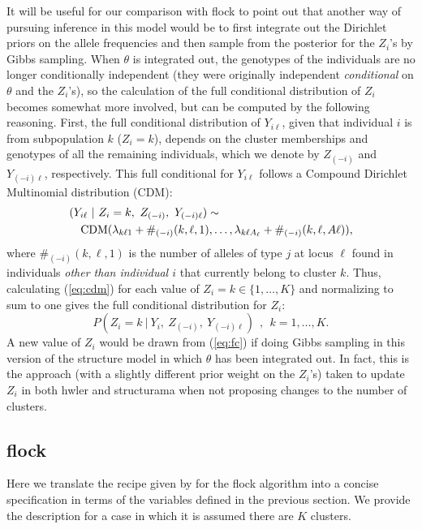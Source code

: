 It will be useful for our comparison with {\sc flock} to point out that another way 
of pursuing inference in this model would be to first integrate out the 
Dirichlet priors on the allele frequencies and then sample from the posterior
for the $Z_i$'s by Gibbs sampling.  When $\theta$ is integrated out, the genotypes 
of the individuals are no longer conditionally independent (they were originally
independent {\em conditional} on $\theta$ and the $Z_i$'s), so the calculation of 
the full conditional distribution of $Z_i$ becomes somewhat more involved,
but can be computed by the following reasoning. First, the full 
conditional distribution of $Y_{i\ell}$, given that individual $i$ is from subpopulation $k$
(\ie $Z_i=k$), depends on the 
cluster memberships and genotypes  of all the remaining individuals,
which we denote by  $Z_{(-i)}$ and $Y_{(-i)\ell}$, respectively.
This full conditional for $Y_{i\ell}$ follows 
a Compound Dirichlet Multinomial distribution (CDM):
\begin{eqnarray}
\lefteqn{(Y_{i\ell}~|~Z_i=k,~Z_{(-i)},~Y_{(-i)\ell}) \sim} \label{eq:cdm}\\
& & \mathrm{CDM}(\lambda_{k\ell 1} + \#_{(-i)}(k,\ell,1), \ldots,
\lambda_{k\ell A_\ell} + \#_{(-i)}(k,\ell,A\ell)), \nonumber
\end{eqnarray}
where $\#_{(-i)}(k,\ell,1)$ is the number of alleles of type $j$ at locus $\ell$
found in individuals {\em other than individual $i$} that currently
belong to cluster $k$. Thus, calculating (\ref{eq:cdm}) for each value of $Z_i=k \in 
\{1,\ldots,K\}$ 
and normalizing to sum to one gives the full conditional distribution for 
$Z_i$:
\begin{equation}
P(Z_i=k~|~Y_i, ~Z_{(-i)},~Y_{(-i)\ell})~~,~~k=1,\ldots,K.
\label{eq:fc}
\end{equation}
A new value of $Z_i$ would be drawn from (\ref{eq:fc}) if doing Gibbs sampling in this
version of the {\sc structure} model in which $\theta$ has been integrated out.  In 
fact,
this is the approach (with a slightly different prior weight on the $Z_i$'s) taken to 
update 
$Z_i$ in both {\sc hwler} \citep{Pel&Mas2006} and {\sc structurama} \cite{Hue&And2007} 
when not
proposing changes to the number of clusters.



\subsection*{{\sc flock}}
Here we translate the recipe given by \citeauthor{Duc&Tur2009} for the 
{\sc flock} algorithm into a concise specification in terms of the variables
defined in the previous section.  We provide the description for a case in which
it is assumed there are $K$ clusters.

